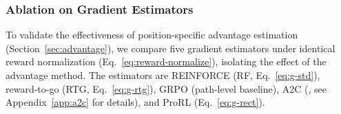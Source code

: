 \begin{table}[t!]
\centering
  \caption{{Analysis of gradient estimators on ML-1M. We report final performance, average path length at training Epochs 1, 5, 10, and advantage variance (normalized to Epoch~1 of RF).}}
  \label{tab:stability}
\end{table}





\subsubsection{Ablation on Gradient Estimators}
\label{sec:ablation_gradient}

To validate the effectiveness of position-specific advantage estimation (Section~\ref{sec:advantage}), we compare five gradient estimators under identical reward normalization (Eq.~\eqref{eq:reward-normalize}), isolating the effect of the advantage method. The estimators are REINFORCE (RF, Eq.~\eqref{eq:g-std}), reward-to-go (RTG, Eq.~\eqref{eq:g-rtg}), GRPO (path-level baseline), A2C (\citet{pmlr-v48-mniha16}, see Appendix~\ref{app:a2c} for details), and ProRL (Eq.~\eqref{eq:g-rect}).

